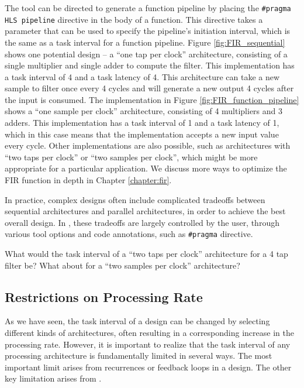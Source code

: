 The \VHLS tool can be directed to generate a function pipeline by placing the \lstinline|#pragma HLS pipeline| directive in the body of a function.  This directive takes a parameter that can be used to specify the pipeline's initiation interval, which is the same as a task interval for a function pipeline.  Figure \ref{fig:FIR_sequential} shows one potential design -- a ``one tap per clock'' architecture, consisting of a single multiplier and single adder to compute the filter.  This implementation has a task interval of 4 and a task latency of 4.  This architecture can take a new sample to filter once every 4 cycles and will generate a new output 4 cycles after the input is consumed. The implementation in Figure \ref{fig:FIR_function_pipeline} shows a ``one sample per clock'' architecture, consisting of 4 multipliers and 3 adders.  This implementation has a task interval of 1 and a task latency of 1, which in this case means that the implementation accepts a new input value every cycle. Other implementations are also possible, such as architectures with ``two taps per clock'' or ``two samples per clock'', which might be more appropriate for a particular application.   We discuss more ways to optimize the FIR function in depth in Chapter \ref{chapter:fir}. 

In practice, complex designs often include complicated tradeoffs between sequential architectures and parallel architectures, in order to achieve the best overall design.  In \VHLS, these tradeoffs are largely controlled by the user, through various tool options and code annotations, such as \lstinline|#pragma| directive.

\begin{exercise}
What would the task interval of a ``two taps per clock'' architecture for a 4 tap filter be?  What about for a ``two samples per clock'' architecture?
\end{exercise}

\subsection{Restrictions on Processing Rate}

As we have seen, the task interval of a design can be changed by selecting different kinds of architectures, often resulting in a corresponding increase in the processing rate.  However, it is important to realize that the task interval of any processing architecture is fundamentally limited in several ways.  The most important limit arises from \glspl{recurrence} or feedback loops in a design.  The other key limitation arises from .

